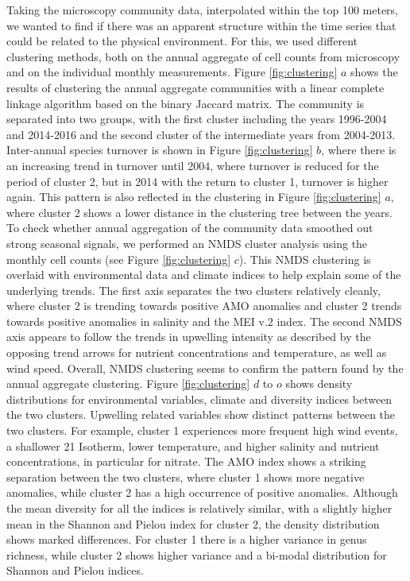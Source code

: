\documentclass[draft]{agujournal2019}
\begin{document}
Taking the microscopy community data, interpolated within the top 100 meters, we wanted to find if there was an apparent structure within the time series that could be related to the physical environment. For this, we used different clustering methods, both on the annual aggregate of cell counts from microscopy and on the individual monthly measurements. Figure \ref{fig:clustering} $a$ shows the results of clustering the annual aggregate communities with a linear complete linkage algorithm based on the binary Jaccard matrix. The community is separated into two groups, with the first cluster including the years 1996-2004 and 2014-2016 and the second cluster of the intermediate years from 2004-2013. 
Inter-annual species turnover is shown in Figure \ref{fig:clustering} $b$, where there is an increasing trend in turnover until 2004, where turnover is reduced for the period of cluster 2, but in 2014 with the return to cluster 1, turnover is higher again. This pattern is also reflected in the clustering in Figure \ref{fig:clustering} $a$, where cluster 2 shows a lower distance in the clustering tree between the years. 
To check whether annual aggregation of the community data smoothed out strong seasonal signals, we performed an NMDS cluster analysis using the monthly cell counts (see Figure \ref{fig:clustering} $c$). This NMDS clustering is overlaid with environmental data and climate indices to help explain some of the underlying trends. The first axis separates the two clusters relatively cleanly, where cluster 2 is trending towards positive AMO anomalies and cluster 2 trends towards positive anomalies in salinity and the MEI v.2 index. The second NMDS axis appears to follow the trends in upwelling intensity as described by the opposing trend arrows for nutrient concentrations and temperature, as well as wind speed. Overall, NMDS clustering seems to confirm the pattern found by the annual aggregate clustering. 
Figure \ref{fig:clustering} $d$ to $o$ shows density distributions for environmental variables, climate and diversity indices between the two clusters. Upwelling related variables show distinct patterns between the two clusters. For example, cluster 1 experiences more frequent high wind events, a shallower \qty{21}{\celcius} Isotherm, lower temperature, and higher salinity and nutrient concentrations, in particular for nitrate. The AMO index shows a striking separation between the two clusters, where cluster 1 shows more negative anomalies, while cluster 2 has a high occurrence of positive anomalies. Although the mean diversity for all the indices is relatively similar, with a slightly higher mean in the Shannon and Pielou index for cluster 2, the density distribution shows marked differences. For cluster 1 there is a higher variance in genus richness, while cluster 2 shows higher variance and a bi-modal distribution for Shannon and Pielou indices. 
\end{document}
